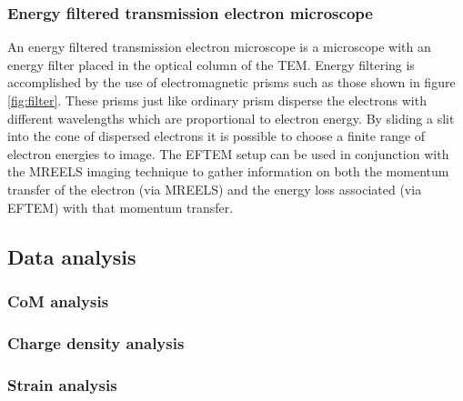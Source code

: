\subsubsection{Energy filtered transmission electron microscope}
\label{sec:eftem}
An energy filtered transmission electron microscope is a microscope with an energy filter placed in the optical column of the TEM. Energy filtering is accomplished by the use of electromagnetic prisms such as those shown in figure \ref{fig:filter}.
These prisms just like ordinary prism disperse the electrons with different wavelengths which are proportional to electron energy. By sliding a slit into the cone of dispersed electrons it is possible to choose a finite range of electron energies to image.
The EFTEM setup can be used in conjunction with the MREELS imaging technique to gather information on both the momentum transfer of the electron (via MREELS) and the energy loss associated (via EFTEM) with that momentum transfer.






\subsection{Data analysis}
\subsubsection{CoM analysis}
\subsubsection{Charge density analysis}
\subsubsection{Strain analysis}




